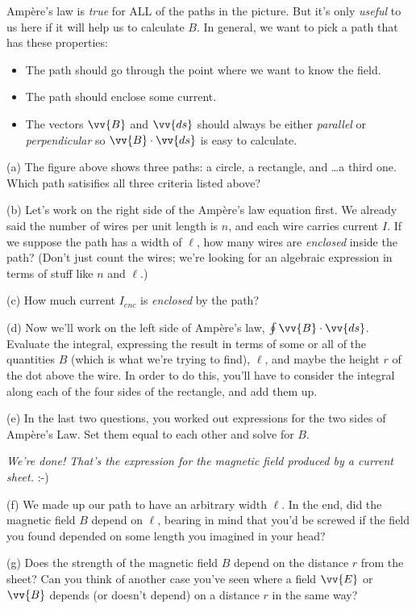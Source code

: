 Amp\`ere's law is \textit{true} for ALL of the paths in the picture.  But it's only \textit{useful} to us here if it will help us to calculate $B$.  In general, we want to pick a path that has these properties:
\begin{itemize}
\item The path should go through the point where we want to know the field.
\item The path should enclose some current.
\item The vectors $\vv{B}$ and $\vv{ds}$ should always be either \textit{parallel} or \textit{perpendicular} so $\vv{B}\cdot \vv{ds}$ is easy to calculate.
\end{itemize}

(a) The figure above shows three paths: a circle, a rectangle, and \ldots a third one.  Which path satisifies all three criteria listed above?
\answerspace{0.3in}

(b) Let's work on the right side of the Amp\`ere's law equation first.  We already said the number of wires per unit length is $n$, and each wire carries current $I$.  If we suppose the path has a width of $\ell$, how many wires are \textit{enclosed} inside the path?  (Don't just count the wires; we're looking for 
an algebraic expression in terms of stuff like $n$ and $\ell$.)
\answerspace{0.3in}


\pagebreak[3]
(c) How much current $I_{enc}$ is \textit{enclosed} by the path?
\answerspace{0.4in}

(d) Now we'll work on the left side of Amp\`ere's law, $\oint \vv {B}\cdot \vv{ds}$.  Evaluate the integral, 
expressing the result in terms of some
or all of the quantities $B$ (which is what we're trying
to find), $\ell$, and maybe the height $r$ of the dot above the wire.  In order to do this, you'll have to consider
the integral along each of the four sides of the rectangle,
and add them up.
\answerspace{1.3in}

(e) In the last two questions, you worked out expressions
for the two sides of Amp\`ere's Law. Set them equal to each other
and solve for $B$.
\answerspace{1in}

\centerline{\textit{We're done! That's the expression for the magnetic field produced 
by a current sheet.}  :-)}

(f) We made up our path to have an arbitrary width $\ell$.  In the end, did the magnetic field $B$ depend on $\ell$, bearing in mind that you'd be screwed if the field you found depended on some length you imagined in your head?
\answerspace{0.4in}

(g) Does the strength of the magnetic field $B$ depend on the
distance $r$ from the sheet?  Can you think of another case you've seen where a field $\vv{E}$ or $\vv{B}$ depends (or doesn't depend) on a distance $r$ in the same way?
\answerspace{0.4in}
